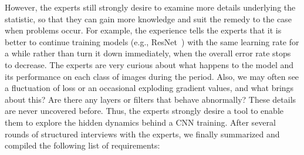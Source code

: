 \documentclass[format=acmsmall, review=false, screen=true]{acmart}
\newcommand{\dy}{\textcolor[rgb]{0,0,0}}
\begin{document}
However, the experts still strongly desire to examine more details underlying the statistic, so that they can gain more knowledge and suit the remedy to the case when problems occur. 	
For example, the experience tells the experts that it is better to continue training models (e.g., ResNet~\cite{he2016deep}) with the same learning rate for a while rather than turn it down immediately, when the overall error rate stops to decrease. The experts are very curious about what happens to the model and its performance on each class of images during the period. 
Also, we may often see a fluctuation of loss or an occasional exploding gradient values, and what brings about this? Are there any layers or filters that behave abnormally? 
These details are never uncovered before.
Thus, the experts strongly desire a tool to enable them to explore the hidden dynamics behind a CNN training. 
After several rounds of structured interviews with the experts, we finally summarized and compiled the following list of requirements:
\end{document}
